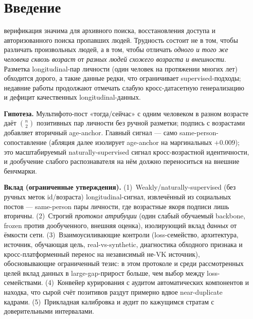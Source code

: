 \documentclass[journal]{IEEEtran}
\begin{document}
\maketitle
\IEEEdisplaynontitleabstractindextext
\IEEEpeerreviewmaketitle

\section{Введение}\label{sec:intro}
 верификация значима для архивного поиска, восстановления доступа и авторизованного поиска пропавших людей. Трудность состоит не в том, чтобы различать произвольных людей, а в том, чтобы отличать \emph{одного и того же человека сквозь возраст} от \emph{разных людей схожего возраста и внешности}. Разметка longitudinal-пар личности (один человек на протяжении многих лет) обходится дорого, а такие данные редки, что ограничивает supervised-подходы; недавние работы продолжают отмечать слабую кросс-датасетную генерализацию и дефицит качественных longitudinal-данных.

\textbf{Гипотеза.} Мультифото-пост «тогда/сейчас» с одним человеком в разном возрасте даёт $\binom{n}{2}$ позитивных пар личности без ручной разметки; подпись с возрастами добавляет вторичный age-anchor. Главный сигнал --- само same-person-сопоставление (абляция далее изолирует age-anchor на маргинальных $+$0.009); это масштабируемый naturally-supervised сигнал кросс-возрастной идентичности, и дообучение слабого распознавателя на нём должно переноситься на внешние бенчмарки.

\textbf{Вклад (ограниченные утверждения).}
(1)~Weakly/naturally-supervised (без ручных меток id/возраста) longitudinal-сигнал, извлечённый из социальных постов --- same-person пары личности, где возрастные якоря подписи лишь вторичны.
(2)~Строгий \emph{протокол атрибуции} (один слабый обучаемый backbone, frozen против дообученного, внешняя оценка), изолирующий вклад \emph{данных} от ёмкости сети.
(3)~Взаимоусиливающие контроли (loss-семейство, архитектура, источник, обучающая цель, real-vs-synthetic, диагностика обходного признака и кросс-платформенный перенос на независимый не-VK источник), обосновывающие ограниченный тезис: в этом протоколе и среди рассмотренных целей вклад данных в large-gap-прирост больше, чем выбор между loss-семействами.
(4)~Конвейер курирования с аудитом автоматических компонентов и находка, что сырой счёт позитивов раздут примерно вдвое near-duplicate кадрами.
(5)~Прикладная калибровка и аудит по кажущимся стратам с доверительными интервалами.
\end{document}
